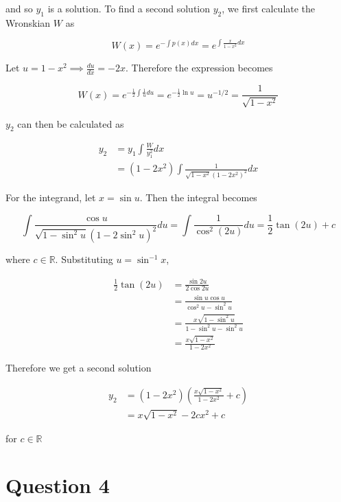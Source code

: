 \documentclass{article}
\begin{document}
and so $y_1$ is a solution. To find a second solution $y_2$, we first calculate the Wronskian $W$ as

\begin{equation*}
    W(x) = e^{-\int p(x) dx} = e^{\int \frac{x}{1 - x^2} dx}
\end{equation*}

Let $u = 1 - x^2 \implies \frac{du}{dx} = -2x$. Therefore the expression becomes

\begin{equation*}
    W(x) = e^{-\frac{1}{2}\int \frac{1}{u} du} = e^{-\frac{1}{2}\ln u} = u^{-1/2} = \frac{1}{\sqrt{1 - x^2}}
\end{equation*}

$y_2$ can then be calculated as

\begin{align*}
    y_2 &= y_1 \int \frac{W}{y_1^2} dx\\
    &= (1 - 2x^2) \int \frac{1}{\sqrt{1 - x^2}(1 - 2x^2)^2} dx
\end{align*}

For the integrand, let $x = \sin u$. Then the integral becomes

\begin{equation*}
    \int \frac{\cos u}{\sqrt{1 - \sin^2u}(1 - 2\sin^2 u)^2} du = \int \frac{1}{\cos^2(2u)} du = \frac{1}{2}\tan(2u) + c
\end{equation*}

where $c \in \mathbb{R}$. Substituting $u = \sin^{-1} x$,

\begin{align*}
    \frac{1}{2}\tan(2u) &= \frac{\sin 2u}{2\cos 2u}\\
    &= \frac{\sin u \cos u}{\cos^2u - \sin^2u}\\
    &= \frac{x\sqrt{1 - \sin^2u}}{1 - \sin^2u - \sin^2u}\\
    &= \frac{x\sqrt{1 - x^2}}{1 - 2x^2}
\end{align*}

Therefore we get a second solution

\begin{align*}
    y_2 &= (1 - 2x^2)\left(\frac{x\sqrt{1 - x^2}}{1 - 2x^2} + c\right)\\
    &= x\sqrt{1 - x^2} - 2cx^2 + c
\end{align*}

for $c \in \mathbb{R}$

\section*{Question 4}
\end{document}
